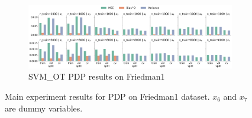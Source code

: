 \documentclass[runningheads]{llncs}
\begin{document}
\begin{figure}[ht]
\begin{subfigure}[b]{\textwidth}
        \centering
        \includegraphics[width=\textwidth]{img/Friedman1-all/feature_effect_errors_pdp_SVM_OT.png}
        \caption{SVM\_OT PDP results on Friedman1}
    \end{subfigure}
    \caption{Main experiment results for PDP on Friedman1 dataset. $x_6$ and $x_7$ are dummy variables.}
    \label{fig:pdp-results-friedman1}  %
\end{figure}
\end{document}
